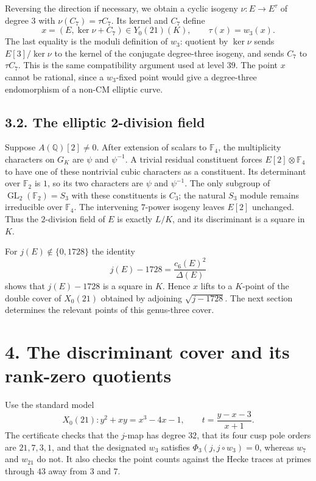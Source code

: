 \documentclass[
  11pt,
]{article}
\begin{document}
Reversing the direction if necessary, we obtain a cyclic isogeny
\(\nu:E\to E^\tau\) of degree \(3\) with \(\nu(C_7)=\tau C_7\). Its
kernel and \(C_7\) define \[
x=(E,\ker\nu+C_7)\in Y_0(21)(K),\qquad \tau(x)=w_3(x).
\] The last equality is the moduli definition of \(w_3\): quotient by
\(\ker\nu\) sends \(E[3]/\ker\nu\) to the kernel of the conjugate
degree-three isogeny, and sends \(C_7\) to \(\tau C_7\). This is the
same compatibility argument used at level \(39\). The point \(x\) cannot
be rational, since a \(w_3\)-fixed point would give a degree-three
endomorphism of a non-CM elliptic curve.

\subsection{3.2. The elliptic 2-division
field}\label{the-elliptic-2-division-field}

Suppose \(A(\mathbb Q)[2]\ne0\). After extension of scalars to
\(\mathbb F_4\), the multiplicity characters on \(G_K\) are \(\psi\) and
\(\psi^{-1}\). A trivial residual constituent forces
\(E[2]\otimes\mathbb F_4\) to have one of these nontrivial cubic
characters as a constituent. Its determinant over \(\mathbb F_2\) is
\(1\), so its two characters are \(\psi\) and \(\psi^{-1}\). The only
subgroup of \(\operatorname{GL}_2(\mathbb F_2)=S_3\) with these
constituents is \(C_3\); the natural \(S_3\) module remains irreducible
over \(\mathbb F_4\). The intervening \(7\)-power isogeny leaves
\(E[2]\) unchanged. Thus the \(2\)-division field of \(E\) is exactly
\(L/K\), and its discriminant is a square in \(K\).

For \(j(E)\notin\{0,1728\}\) the identity \[
j(E)-1728=\frac{c_6(E)^2}{\Delta(E)}
\] shows that \(j(E)-1728\) is a square in \(K\). Hence \(x\) lifts to a
\(K\)-point of the double cover of \(X_0(21)\) obtained by adjoining
\(\sqrt{j-1728}\). The next section determines the relevant points of
this genus-three cover.

\section{4. The discriminant cover and its rank-zero
quotients}\label{the-discriminant-cover-and-its-rank-zero-quotients}

Use the standard model \[
X_0(21):y^2+xy=x^3-4x-1,
\qquad t=\frac{y-x-3}{x+1}.
\] The certificate checks that the \(j\)-map has degree \(32\), that its
four cusp pole orders are \(21,7,3,1\), and that the designated \(w_3\)
satisfies \(\Phi_3(j,j\circ w_3)=0\), whereas \(w_7\) and \(w_{21}\) do
not. It also checks the point counts against the Hecke traces at primes
through \(43\) away from \(3\) and \(7\).
\end{document}
